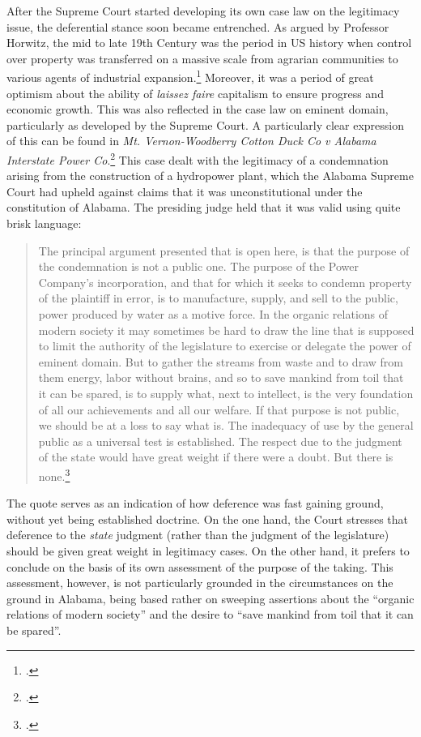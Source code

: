 After the Supreme Court started developing its own case law on the legitimacy issue, the deferential stance soon became entrenched. As argued by Professor Horwitz, the mid to late 19th Century was the period in US history when control over property was transferred on a massive scale from agrarian communities to various agents of industrial expansion.\footcite{horwitz73} Moreover, it was a period of great optimism about the ability of {\it laissez faire} capitalism to ensure progress and economic growth. This was also reflected in the case law on eminent domain, particularly as developed by the Supreme Court. A particularly clear expression of this can be found in {\it Mt. Vernon-Woodberry Cotton Duck Co v Alabama Interstate Power Co}.\footcite{vernon16}  This case dealt with the legitimacy of a condemnation arising from the construction of a hydropower plant, which the Alabama Supreme Court had upheld against claims that it was unconstitutional under the constitution of Alabama. The presiding judge held that it was valid using quite brisk language:

\begin{quote}The principal argument presented that is open here, is that the purpose of the condemnation is not a public one. The purpose of the Power Company's incorporation, and that for which it seeks to condemn property of the plaintiff in error, is to manufacture, supply, and sell to the public, power produced by water as a motive force. In the organic relations of modern society it may sometimes be hard to draw the line that is supposed to limit the authority of the legislature to exercise or delegate the power of eminent domain. But to gather the streams from waste and to draw from them energy, labor without brains, and so to save mankind from toil that it can be spared, is to supply what, next to intellect, is the very foundation of all our achievements and all our welfare. If that purpose is not public, we should be at a loss to say what is. The inadequacy of use by the general public as a universal test is established. The respect due to the judgment of the state would have great weight if there were a doubt. But there is none.\footcite[]{vernon16}
\end{quote}

The quote serves as an indication of how deference was fast gaining ground, without yet being established doctrine. On the one hand, the Court stresses that deference to the {\it state} judgment (rather than the judgment of the legislature) should be given great weight in legitimacy cases. On the other hand, it prefers to conclude on the basis of its own assessment of the purpose of the taking. This assessment, however, is not particularly grounded in the circumstances on the ground in Alabama, being based rather on sweeping assertions about the ``organic relations of modern society'' and the desire to ``save mankind from toil that it can be spared''. 

